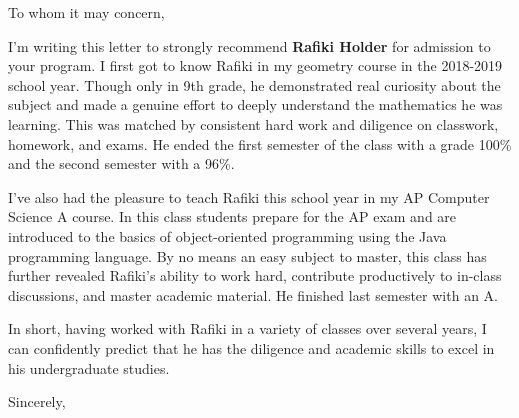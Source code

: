\documentclass{letter}
\begin{document}
\begin{letter}{}
\opening{To whom it may concern,}

I'm writing this letter to strongly recommend  \textbf{Rafiki Holder} for admission to your program.  I first got to know Rafiki in my geometry course in the 2018-2019 school year. Though only in 9th grade,  he  demonstrated real curiosity about the subject and made a genuine effort to deeply understand  the mathematics he was learning. This was matched by consistent hard work and diligence on classwork, homework, and exams. He ended the first semester of the class with a  grade 100\% and the second semester with a 96\%.  

I've also had the pleasure to teach Rafiki this school year in my  AP Computer Science A course.  In this class students prepare for the AP exam and are introduced to the basics of object-oriented programming using the Java programming language.  By no means an easy subject to master, this class has further revealed Rafiki's ability to work hard, contribute productively to in-class discussions, and master academic material.  He finished last semester with an A.

In short, having worked with Rafiki in a variety of classes over several years, I can confidently predict that he has the diligence and academic skills  to  excel in his undergraduate studies.

\closing{Sincerely,}

\end{letter}
\end{document}
